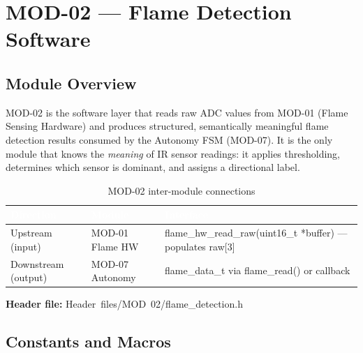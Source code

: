 \documentclass[12pt,a4paper]{article}
\newcommand{\theadtext}[1]{\textcolor{white}{\textbf{#1}}}
\newcommand{\fn}[1]{{\footnotesize\ttfamily #1}}
\begin{document}
\section{MOD-02 --- Flame Detection Software}

\subsection{Module Overview}

MOD-02 is the software layer that reads raw ADC values from MOD-01 (Flame Sensing
Hardware) and produces structured, semantically meaningful flame detection results
consumed by the Autonomy FSM (MOD-07). It is the only module that knows the
\emph{meaning} of IR sensor readings: it applies thresholding, determines which
sensor is dominant, and assigns a directional label.

\begin{table}[H]
\centering\small
\begin{tabularx}{\textwidth}{L{2.8cm} L{3cm} X}
\toprule
{}
\theadtext{Direction} & \theadtext{Module} & \theadtext{Interface} \\
\midrule
{}   Upstream (input)    & MOD-01 Flame HW & \fn{flame\_hw\_read\_raw(uint16\_t *buffer)} --- populates \fn{raw[3]} \\
 Downstream (output) & MOD-07 Autonomy & \fn{flame\_data\_t} via \fn{flame\_read()} or callback \\
\bottomrule
\end{tabularx}
\caption{MOD-02 inter-module connections}
\end{table}

\textbf{Header file:} \fn{Header\ files/MOD\ 02/flame\_detection.h}

\subsection{Constants and Macros}
\end{document}
